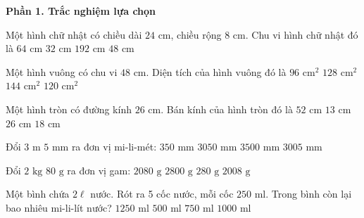\textbf{Phần 1. Trắc nghiệm lựa chọn}

\begin{ex} %
Một hình chữ nhật có chiều dài $24\text{ cm}$, chiều rộng $8\text{ cm}$. Chu vi hình chữ nhật đó là
\choice
{\True $64\text{ cm}$}
{$32\text{ cm}$}
{$192\text{ cm}$}
{$48\text{ cm}$}
\end{ex}

\begin{ex} %
Một hình vuông có chu vi $48\text{ cm}$. Diện tích của hình vuông đó là
\choice
{$96\text{ cm}^2$}
{$128\text{ cm}^2$}
{\True $144\text{ cm}^2$}
{$120\text{ cm}^2$}
\end{ex}

\begin{ex} %
Một hình tròn có đường kính $26\text{ cm}$. Bán kính của hình tròn đó là
\choice
{$52\text{ cm}$}
{\True $13\text{ cm}$}
{$26\text{ cm}$}
{$18\text{ cm}$}
\end{ex}

\begin{ex} %
Đổi $3\text{ m } 5\text{ mm}$ ra đơn vị mi-li-mét:
\choice
{$350\text{ mm}$}
{$3050\text{ mm}$}
{$3500\text{ mm}$}
{\True $3005\text{ mm}$}
\end{ex}

\begin{ex} %
Đổi $2\text{ kg } 80\text{ g}$ ra đơn vị gam:
\choice
{\True $2080\text{ g}$}
{$2800\text{ g}$}
{$280\text{ g}$}
{$2008\text{ g}$}
\end{ex}

\begin{ex} %
Một bình chứa $2\ell$ nước. Rót ra 5 cốc nước, mỗi cốc $250\text{ ml}$. Trong bình còn lại bao nhiêu mi-li-lít nước?
\choice
{$1250\text{ ml}$}
{$500\text{ ml}$}
{\True $750\text{ ml}$}
{$1000\text{ ml}$}
\end{ex}

